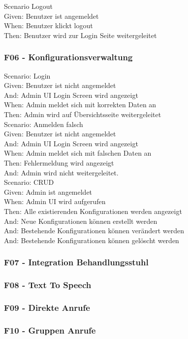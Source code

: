         Scenario Logout\\
        Given: Benutzer ist angemeldet\\
        When:  Benutzer klickt logout\\
        Then: Benutzer wird zur Login Seite weitergeleitet\\


    \subsubsection*{F06 - Konfigurationsverwaltung}

        Scenario: Login\\
        Given: Benutzer ist nicht angemeldet\\
        And:   Admin UI Login Screen wird angezeigt\\
        When:  Admin meldet sich mit korrekten Daten an\\
        Then:  Admin wird auf Übersichtsseite weitergeleitet\\

        Scenario: Anmelden falsch\\
        Given: Benutzer ist nicht angemeldet\\
        And:   Admin UI Login Screen wird angezeigt\\
        When:  Admin meldet sich mit falschen Daten an\\
        Then:  Fehlermeldung wird angezeigt\\
        And:  Admin wird nicht weitergeleitet.\\

        Scenario: CRUD\\
        Given: Admin ist angemeldet\\
        When: Admin UI wird aufgerufen\\
        Then: Alle existierenden Konfigurationen werden angezeigt\\
        And: Neue Konfigurationen können erstellt werden\\
        And: Bestehende Konfigurationen können verändert werden\\
        And: Bestehende Konfigurationen können gelöscht werden\\

    \subsubsection*{F07 - Integration Behandlungsstuhl}
    \subsubsection*{F08 - Text To Speech}
    \subsubsection*{F09 - Direkte Anrufe}
    \subsubsection*{F10 - Gruppen Anrufe}



